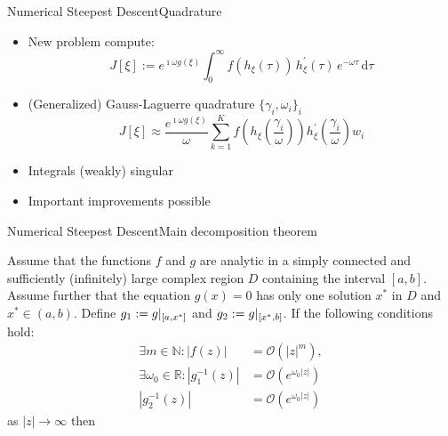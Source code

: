 \documentclass{beamer}
\begin{document}
\begin{frame}{Numerical Steepest Descent}{Quadrature}
  \begin{itemize}
    \item New problem compute:
    \begin{equation*}
      J[\xi] :=
      e^{\imath \omega g(\xi)}
      \int_{0}^{\infty}
        f(h_{\xi}(\tau)) \,
        h_{\xi}^{\prime}(\tau) \,
        e^{-\omega \tau} \,
      \mathrm{d}\tau
    \end{equation*}
    \item (Generalized) Gauss-Laguerre quadrature $\{\gamma_i, \omega_i\}_i$
    \begin{equation*}
    J[\xi] \approx
    \frac{e^{\imath \omega g(\xi)}}{\omega}
    \sum_{k=1}^K
      f\left(h_{\xi}\left(\frac{\gamma_i}{\omega}\right)\right)
      h_{\xi}^{\prime}\left(\frac{\gamma_i}{\omega}\right)
      w_i
    \end{equation*}
    \item Integrals (weakly) singular
    \item Important improvements possible
  \end{itemize}
\end{frame}


\begin{frame}{Numerical Steepest Descent}{Main decomposition theorem}
  \begin{theorem}
    Assume that the functions $f$ and $g$ are analytic in a simply connected and
    sufficiently (infinitely) large complex region $D$ containing the interval $[a, b]$.
    Assume further that the equation $g(x) = 0$ has only one solution $x^{*}$ in $D$ and
    $x^{*} \in (a, b)$. Define $g_1 := g|_{[a,x^{*}]}$ and $g_2:= g|_{[x^{*},b]}$.
    If the following conditions hold:
    \begin{align*}
      \exists m \in \mathbb{N} : |f(z)| & = \mathcal{O}(|z|^m), \\
      \exists \omega_0 \in \mathbb{R} : |g_1^{-1}(z)| & = \mathcal{O}(e^{\omega_0 |z|}) \\
                                        |g_2^{-1}(z)| & = \mathcal{O}(e^{\omega_0 |z|})
    \end{align*}
    as $|z| \rightarrow \infty$ then
  \end{theorem}
\end{frame}
\end{document}
